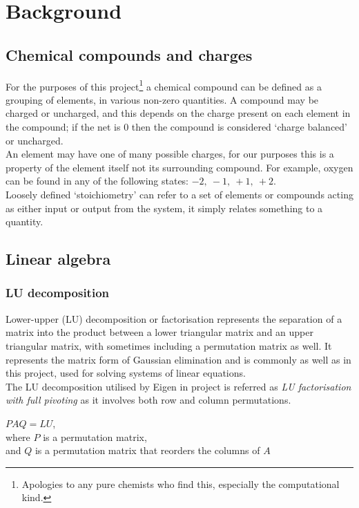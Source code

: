 \chapter{Background}
\label{ch:background}
\section{Chemical compounds and charges}
For the purposes of this project\footnote{Apologies to any pure chemists who find this, especially the computational kind.} a chemical compound can be defined as a grouping of elements, in various non-zero quantities. A compound may be charged or uncharged, and this depends on the charge present on each element in the compound; if the net is $0$ then the compound is considered `charge balanced' or uncharged. \cite{mcnaught1997compendium} \\

An element may have one of many possible charges, for our purposes this is a property of the element itself not its surrounding compound. For example, oxygen can be found in any of the following states: $-2,\ -1,\ +1,\ +2$. \cite{mcnaught1997compendium} \\

Loosely defined `stoichiometry' can refer to a set of elements or compounds acting as either input or output from the system, it simply relates something to a quantity. \cite{mcnaught1997compendium} \\

\section{Linear algebra}
\subsection{LU decomposition}
Lower-upper (LU) decomposition or factorisation represents the separation of a matrix into the product between a lower triangular matrix and an upper triangular matrix, with sometimes including a permutation matrix as well. It represents the matrix form of Gaussian elimination and is commonly as well as in this project, used for solving systems of linear equations.\cite{schwarzenberg1995matrix} \\
The LU decomposition utilised by Eigen in project is referred as \textit{LU factorisation with full pivoting} \cite{trefethen1997numerical} as it involves both row and column permutations.

\begin{center}
  $PAQ = LU$, \\
  \vspace{0.5em}
  where $P$ is a permutation matrix, \\
  and $Q$ is a permutation matrix that reorders the columns of $A$
\end{center}

